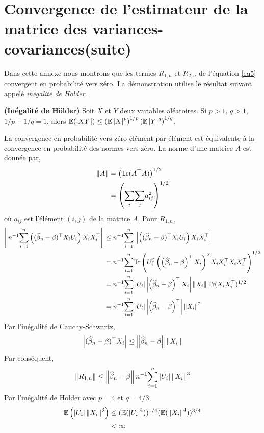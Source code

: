 \documentclass[12pt, reqno]{amsart}
\begin{document}
\section{Convergence de l'estimateur de la matrice des variances-covariances(suite)}
Dans cette annexe nous montrons que les termes $R_{1,n}$ et $R_{2,n}$ de l'équation \eqref{eq5} convergent en probabilité vers zéro. La démonstration utilise le résultat suivant appelé \emph{inégalité de Holder}.
\begin{proposition}\textbf{(Inégalité de Hölder)} Soit $X$ et $Y$ deux variables aléatoires. Si $p>1$, $q>1$,  $1/p +1/q =1$,  alors $\mathbb{E}(\left\vert {XY} \right\vert) \leq \left(\mathbb{E}\left\vert {X} \right\vert^p\right)^{1/p}
\left(\mathbb{E}\left\vert {Y} \right\vert^q\right)^{1/q}$.
\end{proposition}
La convergence en probabilité vers zéro élément par élément est équivalente à la convergence en probabilité des normes vers zéro. La norme d'une matrice $A$ est donnée par,
\begin{align*}
\left\Vert {A} \right\Vert& = \left(\mathrm{Tr}(A^\top A)\right)^{1/2}\\
&= \left(\underset{i}{\sum}\underset{j}{\sum}a_{ij}^2\right)^{1/2}
\end{align*}
où $a_{ij}$ est l'élément $(i, j)$ de la matrice $A$. Pour $R_{1,n}$,
\begin{align*}
\left\Vert {n^{-1}\underset{i=1}{\overset{n}{\sum}}\left((\widehat{\beta}_n - \beta)^\top X_iU_i\right)X_iX_i^\top} \right\Vert &\leq 
n^{-1} \underset{i=1}{\overset{n}{\sum}} \left\Vert {\left((\widehat{\beta}_n - \beta)^\top X_iU_i\right)X_iX_i^\top} \right\Vert\\
 &= n^{-1} \underset{i=1}{\overset{n}{\sum}} \mathrm{Tr}\left(U_i^2\left(\left(\widehat{\beta}_n - \beta\right)^\top X_i\right)^2 X_iX_i^\top X_iX_i^\top\right)^{1/2}\\
 &=n^{-1} \underset{i=1}{\overset{n}{\sum}} \left\vert {U_i} \right\vert\left\vert {\left(\widehat{\beta}_n - \beta\right)^\top X_i} \right\vert\left\Vert {X_i} \right\Vert\mathrm{Tr}(X_iX_i^\top)^{1/2} \\
 &=n^{-1}\underset{i=1}{\overset{n}{\sum}} \left\vert {U_i} \right\vert\left\vert {\left(\widehat{\beta}_n - \beta\right)^\top} \right\vert\left\Vert {X_i} \right\Vert^2
\end{align*}
Par l'inégalité de Cauchy-Schwartz,
\begin{align*}
\left\vert {(\widehat{\beta}_n - \beta)^\top X_i} \right\vert \leq \left\Vert {\widehat{\beta}_n - \beta} \right\Vert\left\Vert {X_i} \right\Vert
\end{align*}
Par conséquent,
\begin{align*}
\left\Vert {R_{1,n}} \right\Vert \leq \left\Vert {\widehat{\beta}_n - \beta} \right\Vert n^{-1} \underset{i=1}{\overset{n}{\sum}} \left\vert {U_i} \right\vert\left\Vert {X_i} \right\Vert^3
\end{align*}
Par l'inégalité de Holder avec $p=4$ et $q=4/3$,
\begin{align*}
\mathbb{E}\left(\left\vert {U_i} \right\vert\left\Vert {X_i} \right\Vert^3\right)&\leq (\mathbb{E}(\left\vert {U_i} \right\vert^4))^{1/4}(\mathbb{E}(\left\Vert {X_i} \right\Vert^4))^{3/4}\\
&< \infty
\end{align*}
\end{document}
